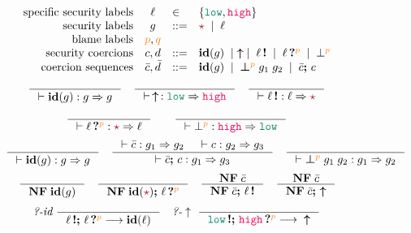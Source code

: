 \begin{figure}[tbp]
\raggedright
  \[
  \begin{array}{rcll}
    \text{specific security labels} & \ell & \in & \{ \low , \high \} \\
    \text{security labels}  & g    & ::= & \unk \MID \ell \\
    \text{blame labels}         & \bl{p}, \bl{q}     &      & \\
    \text{security coercions}            & c, d     & ::=  & \id{g} \MID \up \MID \inj{\ell} \MID \proj{\ell}{p} \MID \bot^{\bl{p}} \\
    \text{coercion sequences} & \bar{c}, \bar{d} & ::=  & \id{g} \MID \err{g_1}{g_2}{p} \MID \bar{c} \seq c
  \end{array}
  \]
  {\small
  \begin{gather*}
    \inference{}{\vdash \id{g} : g \Rightarrow g}
    \quad
    \inference{}
              {\vdash \,\up\, : \low \Rightarrow \high}
    \quad
    \inference{}
              {\vdash \inj{\ell} : \ell \Rightarrow \unk}
    \\[1ex]
    \inference{}
              {\vdash \proj{\ell}{p} : \unk \Rightarrow \ell}
    \qquad
    \inference{}
              {\vdash \bot^{\bl{p}} : \high \Rightarrow \low}
  \end{gather*}}
  {\small
  \begin{gather*}
    \inference{}{\vdash \id{g} : g \Rightarrow g}
    \quad
    \inference{\vdash \bar{c} : g_1 \Rightarrow g_2 & \vdash c : g_2 \Rightarrow g_3}
              {\vdash \bar{c} \seq c : g_1 \Rightarrow g_3}
    \quad
    \inference{}
              {\vdash \err{g_1}{g_2}{p} : g_1 \Rightarrow g_2}
  \end{gather*}}
  {\small
  \begin{gather*}
  \inference{}{\mathbf{NF}\; \id{g}}
  \quad
  \inference{}{\mathbf{NF}\; \id{\unk} \seq \proj{\ell}{p}}
  \quad
  \inference{\mathbf{NF}\; \bar{c}}{\mathbf{NF}\; \bar{c}\seq\inj{\ell}}
  \quad
  \inference{\mathbf{NF}\; \bar{c}}{\mathbf{NF}\; \bar{c}\seq\up}
  \end{gather*}}
  {\small
  \begin{gather*}
  \textit{?-id}~
  \inference{}
            {\inj{\ell} \seq \proj{\ell}{p} \longrightarrow \id{\ell}}
  \quad
  \textit{?-}\uparrow~
  \inference{}
            {\inj{\low} \seq \proj{\high}{p} \longrightarrow \;\;\up}

\end{gather*}}
\end{figure}
